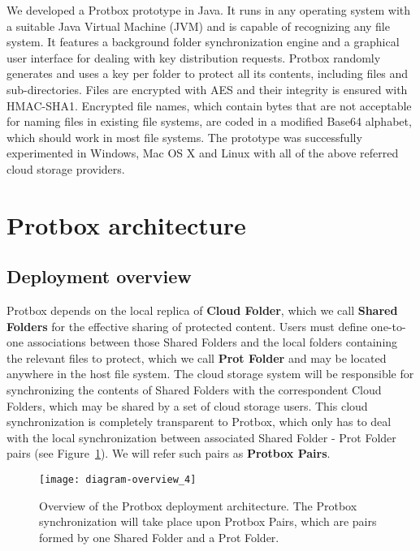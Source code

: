 \documentclass[english]{lni}
\newcommand\protbox{Protbox}
\newcommand\ProtF{Prot Folder}
\newcommand\SharedF{Shared Folder}
\newcommand\SharedFs{Shared Folders}
\newcommand\CloudF{Cloud Folder}
\newcommand\CloudFs{Cloud Folders}
\newcommand\PPairs{{\protbox} Pairs}
\begin{document}
We developed a {\protbox} prototype in Java. It runs in any
operating system with a suitable Java Virtual Machine (JVM) and is
capable of recognizing any file system. It features a background
folder synchronization engine and a graphical user interface for
dealing with key distribution requests. {\protbox} randomly
generates and uses a key per folder to protect all its contents,
including files and sub-directories. Files are encrypted with AES and their integrity is ensured with
HMAC-SHA1. Encrypted file names, which contain bytes that are not
acceptable for naming files in existing file systems, are coded in a
modified Base64 alphabet, which should work in most file systems.
The prototype was successfully experimented in Windows, Mac OS X and 
Linux with all of the above referred cloud storage providers.









\section{{\protbox} architecture}

\subsection{Deployment overview}

{\protbox} depends on the local replica of \textbf{{\CloudF}},
which we call \textbf{\SharedFs} for the effective sharing of
protected content. Users must define one-to-one associations between
those {\SharedFs} and the local folders containing the relevant
files to protect, which we call \textbf{\ProtF} and may be
located anywhere in the host file system. The cloud storage system
will be responsible for synchronizing the contents of {\SharedFs}
with the correspondent {\CloudFs}, which may be shared by a set
of cloud storage users. This cloud synchronization is completely
transparent to {\protbox}, which only has to deal with the local
synchronization between associated {\SharedF} - {\ProtF} pairs
(see Figure~\ref{{\protbox}.Fig}). We will refer such pairs as
\textbf{{\PPairs}}.

\begin{figure}[t]
\texttt{[image: diagram-overview\_4]}
\caption{Overview of the {\protbox} deployment architecture. The
{\protbox} synchronization will take place upon {\PPairs}, which are pairs formed by one {\SharedF} and a {\ProtF}.}
\label{{\protbox}.Fig}
\end{figure}
\end{document}
